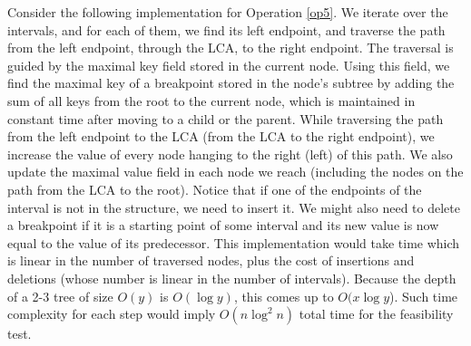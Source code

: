 \documentclass[11pt,a4paper]{article}
\theoremstyle{definition}
\theoremstyle{remark}
\begin{document}
\vspace{0.04in} 
Consider the following implementation for Operation \ref{op5}. We iterate over the intervals, and for each of them, we find its left endpoint, and traverse the path from the left endpoint, through the LCA, to the right endpoint.
The traversal is guided by the maximal key field stored in the current node. Using this field, we find the maximal key of a breakpoint stored in the node's subtree by adding the sum of all keys from the root to the current node, which is maintained in constant time after moving to a child or the parent.
While traversing the path from the left endpoint to the LCA (from the LCA to the right endpoint), we increase the value of every node hanging to the right (left) of this path. We also update the maximal value field in each node we reach (including the nodes on the path from the LCA to the root). Notice that if one of the endpoints of the interval is not in the structure, we need to insert it. We might also need to delete a breakpoint if it is a starting point of some interval and its new value is now equal to the value of its predecessor. This implementation would take time which is linear in the number of traversed nodes, plus the cost of insertions and deletions (whose number is linear in the number of intervals). Because the depth of a 2-3 tree of size $O(y)$ is $O(\log y)$, this comes up to $O(x \log y$). Such time complexity for each step would imply $O(n\log^{2}n)$ total time for the feasibility test.
\end{document}
